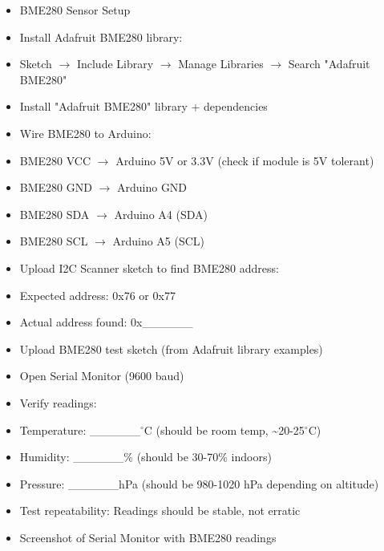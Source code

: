 \documentclass[11pt,letterpaper]{article}
\begin{document}
\begin{itemize}
  \item BME280 Sensor Setup
  \item Install Adafruit BME280 library:
  \item Sketch $\rightarrow$ Include Library $\rightarrow$ Manage Libraries $\rightarrow$ Search "Adafruit BME280"
  \item Install "Adafruit BME280" library + dependencies
  \item Wire BME280 to Arduino:
  \item BME280 VCC $\rightarrow$ Arduino 5V or 3.3V (check if module is 5V tolerant)
  \item BME280 GND $\rightarrow$ Arduino GND
  \item BME280 SDA $\rightarrow$ Arduino A4 (SDA)
  \item BME280 SCL $\rightarrow$ Arduino A5 (SCL)
  \item Upload I2C Scanner sketch to find BME280 address:
  \item Expected address: 0x76 or 0x77
  \item Actual address found: 0x\_\_\_\_\_\_
  \item Upload BME280 test sketch (from Adafruit library examples)
  \item Open Serial Monitor (9600 baud)
  \item Verify readings:
  \item Temperature: \_\_\_\_\_\_$^\circ$C (should be room temp, \textasciitilde{}20-25$^\circ$C)
  \item Humidity: \_\_\_\_\_\_\% (should be 30-70\% indoors)
  \item Pressure: \_\_\_\_\_\_hPa (should be 980-1020 hPa depending on altitude)
  \item Test repeatability: Readings should be stable, not erratic
  \item Screenshot of Serial Monitor with BME280 readings
\end{itemize}
\end{document}
